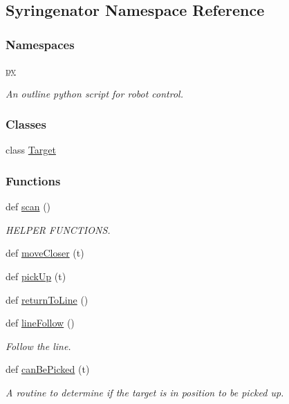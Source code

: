 \hypertarget{namespaceSyringenator}{}\subsection{Syringenator Namespace Reference}
\label{namespaceSyringenator}
\subsubsection*{Namespaces}
\begin{DoxyCompactItemize}
\item 
 \mbox{\hyperlink{namespaceSyringenator_1_1py}{py}}
\begin{DoxyCompactList}\small\item\em An outline python script for robot control. \end{DoxyCompactList}\end{DoxyCompactItemize}
\subsubsection*{Classes}
\begin{DoxyCompactItemize}
\item 
class \mbox{\hyperlink{classSyringenator_1_1Target}{Target}}
\end{DoxyCompactItemize}
\subsubsection*{Functions}
\begin{DoxyCompactItemize}
\item 
def \mbox{\hyperlink{namespaceSyringenator_aff01237d3ff3e33f0ffc32927d813df0}{scan}} ()
\begin{DoxyCompactList}\small\item\em H\+E\+L\+P\+ER F\+U\+N\+C\+T\+I\+O\+NS. \end{DoxyCompactList}\item 
def \mbox{\hyperlink{namespaceSyringenator_a6aecf5518c352d012eb1422d9970146d}{move\+Closer}} (t)
\item 
def \mbox{\hyperlink{namespaceSyringenator_a9409dbfa8ede969288bb659ef23befb6}{pick\+Up}} (t)
\item 
def \mbox{\hyperlink{namespaceSyringenator_afe04905c8a4a9d077457422866633203}{return\+To\+Line}} ()
\item 
def \mbox{\hyperlink{namespaceSyringenator_a824ef6e71bc0975483435ffbdd58cb3e}{line\+Follow}} ()
\begin{DoxyCompactList}\small\item\em Follow the line. \end{DoxyCompactList}\item 
def \mbox{\hyperlink{namespaceSyringenator_acb08d40f080a03cb4e7a43ee3ab4854b}{can\+Be\+Picked}} (t)
\begin{DoxyCompactList}\small\item\em A routine to determine if the target is in position to be picked up. \end{DoxyCompactList}\end{DoxyCompactItemize}
